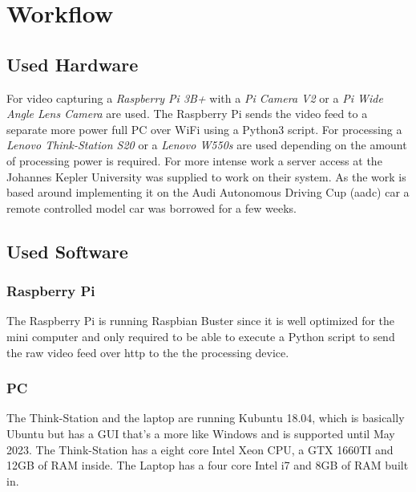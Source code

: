 \chapter{Workflow}


\section{Used Hardware\authorA}
For video capturing a \textit{Raspberry Pi 3B+} with a \textit{Pi Camera V2} or a \textit{Pi Wide Angle Lens Camera} are used. The Raspberry Pi sends the video feed to a separate more power full PC over WiFi using a Python3 script. \newline
For processing a \textit{Lenovo Think-Station S20} or a \textit{Lenovo W550s} are used depending on the amount of processing power is required. For more intense work a server access at the Johannes Kepler University was supplied to work on their system. \newline
As the work is based around implementing it on the Audi Autonomous Driving Cup (\gls{aadc}) car a remote controlled model car was borrowed for a few weeks.


\section{Used Software\authorA}
\subsection{Raspberry Pi}
The Raspberry Pi is running Raspbian Buster since it is well optimized for the mini computer and only required to be able to execute a Python script to send the raw video feed over http to the the processing device.\newline
\subsection{PC}
The Think-Station and the laptop are running Kubuntu 18.04, which is basically Ubuntu but has a GUI that's a more like Windows and is supported until May 2023. \newline
The Think-Station has a eight core Intel Xeon CPU, a GTX 1660TI and 12GB of RAM inside. \newline
The Laptop has a four core Intel i7 and 8GB of RAM built in.\newline

